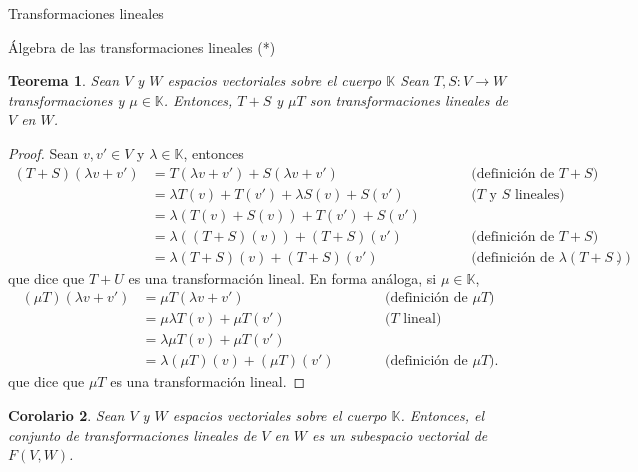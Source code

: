 \documentclass[a4paper,12pt,twoside,spanish,reqno]{amsbook}
\numberwithin{equation}{section}
\newtheorem{teorema}{Teorema}[section]
\newtheorem{corolario}[teorema]{Corolario}
\theoremstyle{definition}
\theoremstyle{remark}
\newcommand{\K}{\mathbb K}
\begin{document}
\begin{chapter}{Transformaciones lineales}
\begin{section}{Álgebra de las transformaciones lineales (*)}
            \begin{teorema}
                Sean $V$ y $W$ espacios vectoriales sobre el cuerpo $\K$ Sean $T,S : V \to W$ transformaciones y $\mu \in \K$. Entonces, $T + S$ y $\mu T$ son transformaciones lineales de $V$ en $W$.
            \end{teorema}
            \begin{proof}
                Sean $v,v' \in V$ y $\lambda \in \K$, entonces
                \begin{equation*}
                \begin{array}{rlll}
                    (T + S)(\lambda v + v') &= T(\lambda v + v') + S(\lambda v + v')&\qquad&\text{(definición de $T+S$)} \\
                    &= \lambda T(v) + T(v') + \lambda S(v) + S(v')& &\text{($T$ y $S$ lineales)}\\
                    &= \lambda (T(v) +S(v)) + T(v') + S(v')&&\text{}\\
                    &= \lambda ((T+S)(v)) + (T + S) (v')& &\text{(definición de $T+S$)}\\
                    &= \lambda(T + S)(v) +(T + S) (v')&&\text{(definición de $\lambda(T + S)$)}.
                \end{array}
                \end{equation*}
                que dice que $T + U$ es una transformación lineal. En forma análoga, si $\mu \in \K$, 
                \begin{equation*}
                \begin{array}{rlll}
                (\mu T)(\lambda v + v') &= \mu T(\lambda v + v')&\qquad&\text{(definición de $\mu T$)} \\
                &= \mu \lambda T(v) + \mu T(v') &\qquad&\text{($T$ lineal)}\\
                &=  \lambda \mu T(v) + \mu T(v')&\qquad&\text{}\\
                &= \lambda (\mu T)(v) + (\mu T)(v') &\qquad&\text{(definición de $\mu T$)}.
                \end{array}
                \end{equation*}
                que dice que $\mu T$ es una transformación lineal.
            \end{proof}
            
        \begin{corolario}
            Sean $V$ y $W$ espacios vectoriales sobre el cuerpo $\K$. Entonces, el conjunto de transformaciones lineales de $V$ en $W$ es un subespacio vectorial  de $F(V,W)$. 
        \end{corolario} 	
            

\end{section}
\end{chapter}
\end{document}
